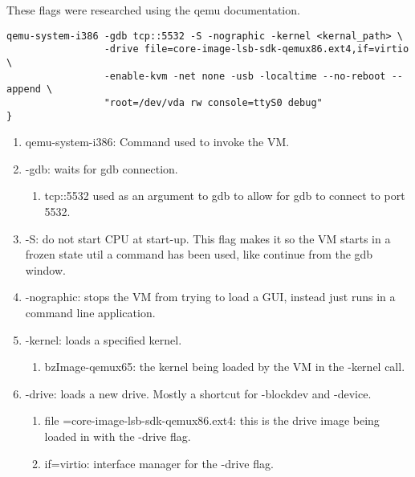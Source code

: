 \documentclass[onecolumn, draftclsnofoot,10pt, compsoc]{IEEEtran}
\begin{document}
These flags were researched using the qemu documentation. \cite{qemu_doc}

\begin{lstlisting}[caption={Qemu Command}, label={lst:qemu}]
qemu-system-i386 -gdb tcp::5532 -S -nographic -kernel <kernal_path> \
                 -drive file=core-image-lsb-sdk-qemux86.ext4,if=virtio \
                 -enable-kvm -net none -usb -localtime --no-reboot --append \
                 "root=/dev/vda rw console=ttyS0 debug"
}
\end{lstlisting}
\vspace{4mm}

\begin{enumerate}
    \item qemu-system-i386: Command used to invoke the VM.
    \item -gdb: waits for gdb connection.

    \begin{enumerate}
        \item tcp::5532 used as an argument to gdb to allow for gdb to connect to port 5532.
    \end{enumerate}

    \item -S: do not start CPU at start-up. This flag makes it so the VM starts in a frozen state util a command has been used, like continue from the gdb window.

    \item -nographic: stops the VM from trying to load a GUI, instead just runs in a command line application.

    \item -kernel: loads a specified kernel.

    \begin{enumerate}
        \item bzImage-qemux65: the kernel being loaded by the VM in the -kernel call.
    \end{enumerate}

    \item -drive: loads a new drive. Mostly a shortcut for -blockdev and -device.

    \begin{enumerate}
        \item file =core-image-lsb-sdk-qemux86.ext4: this is the drive image being loaded in with the -drive flag.
        \item if=virtio: interface manager for the -drive flag.
    \end{enumerate}


\end{enumerate}
\end{document}
